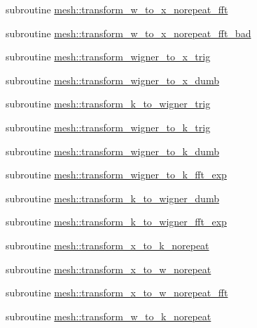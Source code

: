 \begin{DoxyCompactItemize}
\item 
subroutine \hyperlink{namespacemesh_af0c42421bd8b5b74a00094f639c4f7c7}{mesh::transform\_\-w\_\-to\_\-x\_\-norepeat\_\-fft}
\item 
subroutine \hyperlink{namespacemesh_ac641e03ceee3eaba6206a6e3b03db6af}{mesh::transform\_\-w\_\-to\_\-x\_\-norepeat\_\-fft\_\-bad}
\item 
subroutine \hyperlink{namespacemesh_a59d4c181b47238269732a26ba618696e}{mesh::transform\_\-wigner\_\-to\_\-x\_\-trig}
\item 
subroutine \hyperlink{namespacemesh_aee41613b43ab6e2f5a715e21c4227f4c}{mesh::transform\_\-wigner\_\-to\_\-x\_\-dumb}
\item 
subroutine \hyperlink{namespacemesh_ad6c116013ec5d5d4b1e8298749ffa481}{mesh::transform\_\-k\_\-to\_\-wigner\_\-trig}
\item 
subroutine \hyperlink{namespacemesh_affe8a5fb2705abf8f10cbac993ae66ff}{mesh::transform\_\-wigner\_\-to\_\-k\_\-trig}
\item 
subroutine \hyperlink{namespacemesh_ad10642a5ceb6239ab5dbf2124a221b45}{mesh::transform\_\-wigner\_\-to\_\-k\_\-dumb}
\item 
subroutine \hyperlink{namespacemesh_ac76ffd458b6317525fb12c63498439e4}{mesh::transform\_\-wigner\_\-to\_\-k\_\-fft\_\-exp}
\item 
subroutine \hyperlink{namespacemesh_a10655d39a753ec023b2c6b9d36db4663}{mesh::transform\_\-k\_\-to\_\-wigner\_\-dumb}
\item 
subroutine \hyperlink{namespacemesh_a6d0133c6c55c6bfd1929d28d4e48e2d6}{mesh::transform\_\-k\_\-to\_\-wigner\_\-fft\_\-exp}
\item 
subroutine \hyperlink{namespacemesh_a4f07e4d7944353c1362be2da4e27b16e}{mesh::transform\_\-x\_\-to\_\-k\_\-norepeat}
\item 
subroutine \hyperlink{namespacemesh_a1f4e0012bc7646af71d9f56ff2abc54d}{mesh::transform\_\-x\_\-to\_\-w\_\-norepeat}
\item 
subroutine \hyperlink{namespacemesh_adde9e08568da14a3b33bfb7372563330}{mesh::transform\_\-x\_\-to\_\-w\_\-norepeat\_\-fft}
\item 
subroutine \hyperlink{namespacemesh_accd03020a8a261cbf51d9642814db3cb}{mesh::transform\_\-w\_\-to\_\-k\_\-norepeat}
\end{DoxyCompactItemize}
